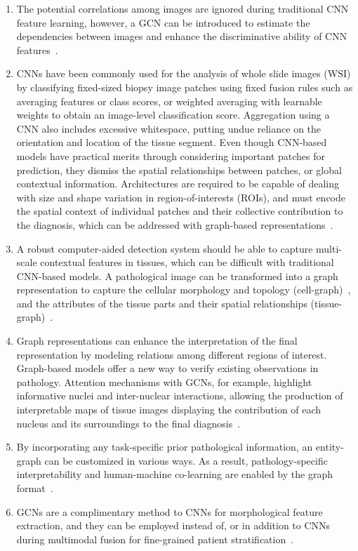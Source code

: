 \begin{enumerate}
    \item The potential correlations among images are ignored during traditional CNN feature learning, however, a GCN can be introduced to estimate the dependencies between images and enhance the discriminative ability of CNN features~.
    \item CNNs have been commonly used for the analysis of whole slide images (WSI) by classifying fixed-sized biopsy image patches using fixed fusion rules such as averaging features or class scores, or weighted averaging with learnable weights to obtain an image-level classification score. 
    Aggregation using a CNN also includes excessive whitespace, putting undue reliance on the orientation and location of the tissue segment.
    Even though CNN-based models have practical merits through considering important patches for prediction, they dismiss the spatial relationships between patches, or global contextual information.
    Architectures are required to be capable of dealing with size and shape variation in region-of-interests (ROIs), and must encode the spatial context of individual patches and their collective contribution to the diagnosis, which can be addressed with graph-based representations~.
    \item A robust computer-aided detection system should be able to capture multi-scale contextual features in tissues, which can be difficult with traditional CNN-based models. A pathological image can be transformed into a graph representation to capture the cellular morphology and topology (cell-graph)~, and the attributes of the tissue parts and their spatial relationships (tissue-graph)~.
    \item Graph representations can enhance the interpretation of the final representation by modeling relations among different regions of interest. Graph-based models offer a new way to verify existing observations in pathology. 
    Attention mechanisms with GCNs, for example, highlight informative nuclei and inter-nuclear interactions, allowing the production of interpretable maps of tissue images displaying the contribution of each nucleus and its surroundings to the final diagnosis~.
    \item By incorporating any task-specific prior pathological information, an entity-graph can be customized in various ways. As a result, pathology-specific interpretability and human-machine co-learning are enabled by the graph format~.
    \item GCNs are a complimentary method to CNNs for morphological feature extraction, and they can be employed instead of, or in addition to CNNs during multimodal fusion for fine-grained patient stratification~.
\end{enumerate}
\vspace{-6pt}

